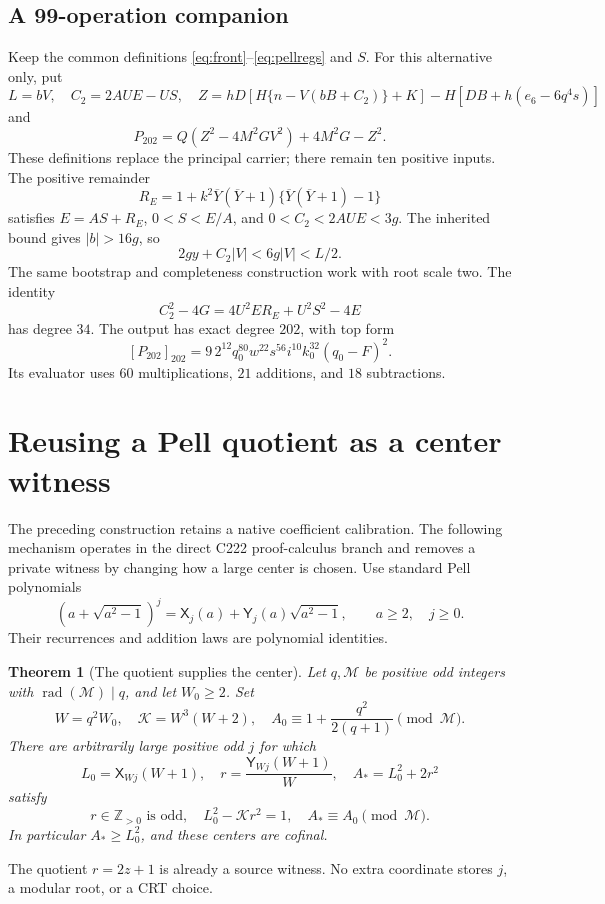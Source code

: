 \documentclass[11pt]{article}
\newtheorem{theorem}{Theorem}[section]
\theoremstyle{remark}
\newcommand{\Zpos}{\mathbb Z_{>0}}
\newcommand{\rad}{\operatorname{rad}}
\newcommand{\yb}{\overline Y}
\newcommand{\PellX}{\mathsf X}
\newcommand{\PellY}{\mathsf Y}
\begin{document}
\subsection{A 99-operation companion}
Keep the common definitions \eqref{eq:front}--\eqref{eq:pellregs} and \(S\).
For this alternative only, put
\[
 L=bV,\quad C_2=2AUE-US,\quad
 Z=hD[H\{n-V(bB+C_2)\}+K]-H[DB+h(e_6-6q^4s)]
\]
and
\[
 P_{202}=Q(Z^2-4M^2GV^2)+4M^2G-Z^2.              \tag{C202}
\]
These definitions replace the principal carrier; there remain ten positive
inputs. The positive remainder
\[
 R_E=1+k^2\yb(\yb+1)\{\yb(\yb+1)-1\}
\]
satisfies \(E=AS+R_E\), \(0<S<E/A\), and
\(0<C_2<2AUE<3g\). The inherited bound gives \(|b|>16g\), so
\[
 2gy+C_2|V|<6g|V|<L/2.
\]
The same bootstrap and completeness construction work with root scale two.
The identity
\[
 C_2^2-4G=4U^2ER_E+U^2S^2-4E
\]
has degree \(34\). The output has exact degree \(202\), with top form
\[
 [P_{202}]_{202}
  =9\,2^{12}q_0^{80}w^{22}s^{56}i^{10}k_0^{32}(q_0-F)^2.
\]
Its evaluator uses \(60\) multiplications, \(21\) additions, and
\(18\) subtractions.

\section{Reusing a Pell quotient as a center witness}\label{sec:recycle}

The preceding construction retains a native coefficient calibration.
The following mechanism operates in the direct C222 proof-calculus branch
and removes a private witness by changing how a large center is chosen.
Use standard Pell polynomials
\[
 (a+\sqrt{a^2-1})^j
   =\PellX_j(a)+\PellY_j(a)\sqrt{a^2-1},
 \qquad a\ge2,\quad j\ge0.
\]
Their recurrences and addition laws are polynomial identities.

\begin{theorem}[The quotient supplies the center]\label{thm:reuse}
Let \(q,\mathcal M\) be positive odd integers with
\(\rad(\mathcal M)\mid q\), and let \(W_0\ge2\).
Set
\[
 W=q^2W_0,\quad \mathcal K=W^3(W+2),\quad
 A_0\equiv1+\frac{q^2}{2(q+1)}\pmod{\mathcal M}.
\]
There are arbitrarily large positive odd \(j\) for which
\[
 L_0=\PellX_{Wj}(W+1),\quad
 r=\frac{\PellY_{Wj}(W+1)}{W},\quad A_*=L_0^2+2r^2
\]
satisfy
\[
 r\in\Zpos\text{ is odd},\quad
 L_0^2-\mathcal K r^2=1,\quad A_*\equiv A_0\pmod{\mathcal M}.
\]
In particular \(A_*\ge L_0^2\), and these centers are cofinal.
\end{theorem}
The quotient \(r=2z+1\) is already a source witness.
No extra coordinate stores \(j\), a modular root, or a CRT choice.
\end{document}
